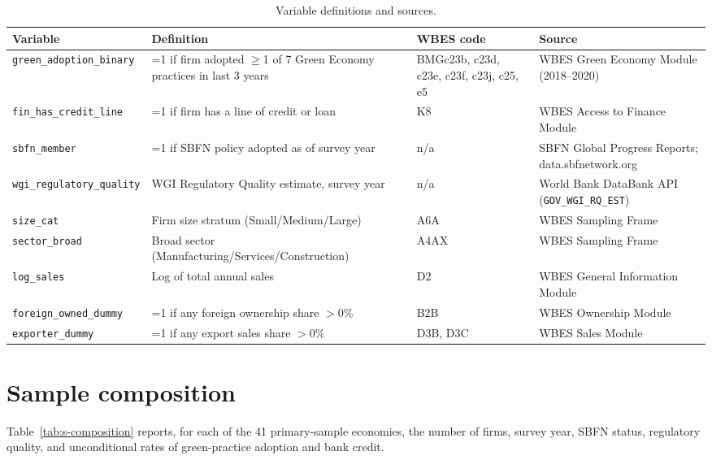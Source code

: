 \documentclass[12pt]{article}
\begin{document}
\begin{table}[htbp]
\centering
\caption{Variable definitions and sources.}
\label{tab:s-vardef}
\begin{scriptsize}
\begin{tabular}{p{3.2cm}p{3.5cm}p{2.1cm}p{4.1cm}}
\toprule
Variable & Definition & WBES code & Source \\
\midrule
\texttt{green\_\allowbreak adoption\_\allowbreak binary} & =1 if firm adopted $\geq$1 of 7 Green Economy practices in last 3 years & BMGc23b, c23d, c23e, c23f, c23j, c25, e5 & WBES Green Economy Module (2018--2020) \\
\texttt{fin\_\allowbreak has\_\allowbreak credit\_\allowbreak line} & =1 if firm has a line of credit or loan & K8 & WBES Access to Finance Module \\
\texttt{sbfn\_\allowbreak member} & =1 if SBFN policy adopted as of survey year & n/a & SBFN Global Progress Reports; data.sbfnetwork.org \\
\texttt{wgi\_\allowbreak regulatory\_\allowbreak quality} & WGI Regulatory Quality estimate, survey year & n/a & World Bank DataBank API (\texttt{GOV\_\allowbreak WGI\_\allowbreak RQ\_\allowbreak EST}) \\
\texttt{size\_cat} & Firm size stratum (Small/Medium/Large) & A6A & WBES Sampling Frame \\
\texttt{sector\_\allowbreak broad} & Broad sector (Manufacturing/Services/Construction) & A4AX & WBES Sampling Frame \\
\texttt{log\_sales} & Log of total annual sales & D2 & WBES General Information Module \\
\texttt{foreign\_\allowbreak owned\_\allowbreak dummy} & =1 if any foreign ownership share $>$0\% & B2B & WBES Ownership Module \\
\texttt{exporter\_\allowbreak dummy} & =1 if any export sales share $>$0\% & D3B, D3C & WBES Sales Module \\
\bottomrule
\end{tabular}
\end{scriptsize}
\end{table}

\section{Sample composition}
\label{sec:s-composition}

Table~\ref{tab:s-composition} reports, for each of the 41 primary-sample economies, the number of firms, survey year, SBFN status, regulatory quality, and unconditional rates of green-practice adoption and bank credit.
\end{document}
